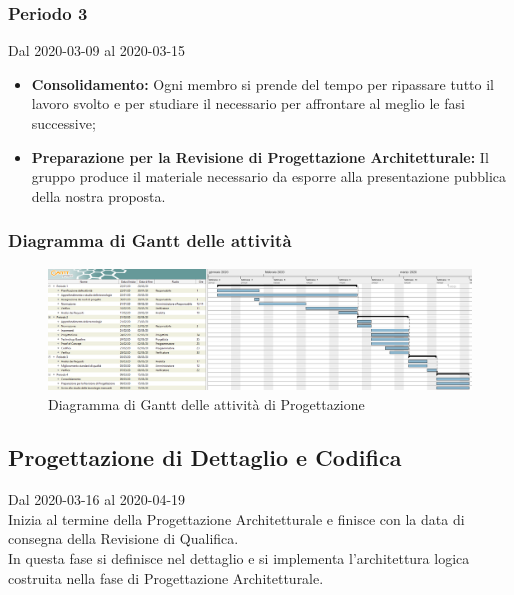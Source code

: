 \subsubsection{Periodo 3} 
Dal 2020-03-09 al 2020-03-15
\begin{itemize}
	\item \textbf{Consolidamento:} Ogni membro si prende del tempo per ripassare tutto il lavoro svolto e per studiare il necessario per affrontare al meglio le fasi successive;
	\item \textbf{Preparazione per la Revisione di Progettazione Architetturale:} Il gruppo produce il materiale necessario da esporre alla presentazione pubblica della nostra proposta.
\end{itemize}

\newpage
\begin{landscape}
	\subsubsection{Diagramma di Gantt delle attività}
	\pagestyle{empty}
	\begin{figure}[h]
		
		\begin{center}	
			\includegraphics[scale=1.6]{Sezioni/DiagrammiGantt/ProgettazioneArchitetturale.png}
		\end{center}
	\caption{Diagramma di Gantt delle attività di Progettazione}	
	\end{figure}
\end{landscape}

\subsection{Progettazione di Dettaglio e Codifica}
Dal 2020-03-16 al 2020-04-19\\
Inizia al termine della Progettazione Architetturale e finisce con la data di consegna della Revisione di Qualifica.\\
In questa fase si definisce nel dettaglio e si implementa l'architettura logica costruita nella fase di Progettazione Architetturale.\\


